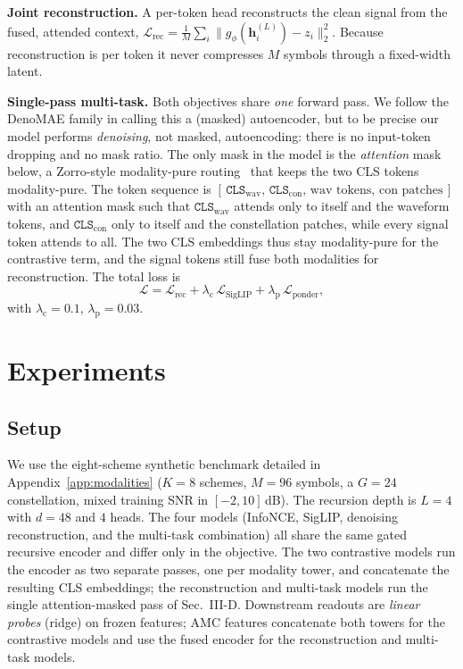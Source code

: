 \documentclass[conference]{IEEEtran}
\begin{document}
\textbf{Joint reconstruction.} A per-token head reconstructs the clean signal from
the fused, attended context,
$\mathcal{L}_{\text{rec}} = \frac{1}{M}\sum_i \| g_\phi(\bm{h}^{(L)}_i) - z_i \|_2^2$.
Because reconstruction is per token it never compresses $M$ symbols through a
fixed-width latent.

\textbf{Single-pass multi-task.} Both objectives share \emph{one} forward
pass. We follow the DenoMAE family in calling this a (masked) autoencoder, but to
be precise our model performs \emph{denoising}, not masked, autoencoding: there is
no input-token dropping and no mask ratio. The only mask in the model is the
\emph{attention} mask below, a Zorro-style modality-pure routing~\cite{zorro} that
keeps the two CLS tokens modality-pure. The
token sequence is $[\,\texttt{CLS}_{\text{wav}},\,\texttt{CLS}_{\text{con}},\,
\text{wav tokens},\,\text{con patches}\,]$ with an attention mask such that
$\texttt{CLS}_{\text{wav}}$ attends only to itself and the waveform tokens, and
$\texttt{CLS}_{\text{con}}$ only to itself and the constellation patches, while
every signal token attends to all. The two CLS embeddings thus stay modality-pure
for the contrastive term, and the signal tokens still fuse both modalities for
reconstruction. The total loss is
\begin{equation}
\mathcal{L} = \mathcal{L}_{\text{rec}} + \lambda_{\text{c}}\,\mathcal{L}_{\text{SigLIP}}
+ \lambda_{\text{p}}\,\mathcal{L}_{\text{ponder}},
\end{equation}
with $\lambda_{\text{c}}{=}0.1$, $\lambda_{\text{p}}{=}0.03$.

\section{Experiments}
\subsection{Setup}
\label{sec:setup}
We use the eight-scheme synthetic benchmark detailed in
Appendix~\ref{app:modalities} ($K{=}8$ schemes, $M{=}96$ symbols, a $G{=}24$
constellation, mixed training SNR in $[-2,10]$\,dB). The recursion depth is
$L{=}4$ with $d{=}48$ and $4$ heads. The four
models (InfoNCE, SigLIP, denoising reconstruction, and the multi-task combination) all
share the same gated recursive encoder and differ only in the objective. The two
contrastive models run the encoder as two separate passes, one per modality tower,
and concatenate the resulting CLS embeddings; the reconstruction and multi-task
models run the single attention-masked pass of Sec.~III-D. Downstream readouts are
\emph{linear probes} (ridge) on frozen features; AMC features concatenate both
towers for the contrastive models and use the fused encoder for the reconstruction
and multi-task models.
\end{document}
